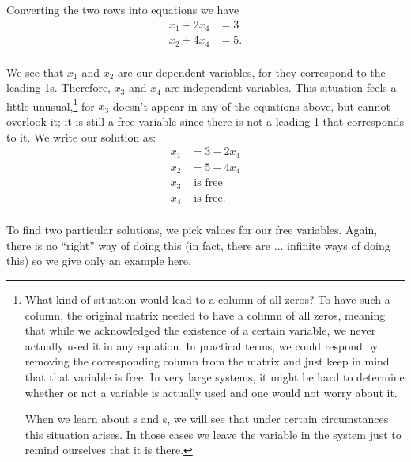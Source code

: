 {Converting the two rows into equations we have \begin{align*} x_1 + 2x_4 &= 3 \\ x_2 + 4x_4&=5.\\ \end{align*}

We see that $x_1$ and $x_2$ are our dependent variables, for they correspond to the leading 1s. Therefore, $x_3$ and $x_4$ are independent variables. This situation feels a little unusual,\footnote{What kind of situation would lead to a column of all zeros? To have such a column, the original matrix needed to have a column of all zeros, meaning that while we acknowledged the existence of a certain variable, we never actually used it in any equation. In practical terms, we could respond by removing the corresponding column from the matrix and just keep in mind that that variable is free. In very large systems, it might be hard to determine whether or not a variable is actually used and one would not worry about it.

When we learn about \ev s and \el s, we will see that under certain circumstances this situation arises. In those cases we leave the variable in the system just to remind ourselves that it is there.\label{footnote:extra_zeros}} for $x_3$ doesn't appear in any of the equations above, but cannot overlook it; it is still a free variable since there is not a leading 1 that corresponds to it. We write our solution as:
\begin{align*} x_1 &= 3-2x_4 \\ x_2 &=5-4x_4 \\ x_3 & \text{ is free} \\ x_4 &  \text{ is free}. \\ \end{align*}

To find two particular solutions, we pick values for our free variables. Again, there is no ``right'' way of doing this (in fact, there are $\ldots$ infinite ways of doing this) so we give only an example here.

}
